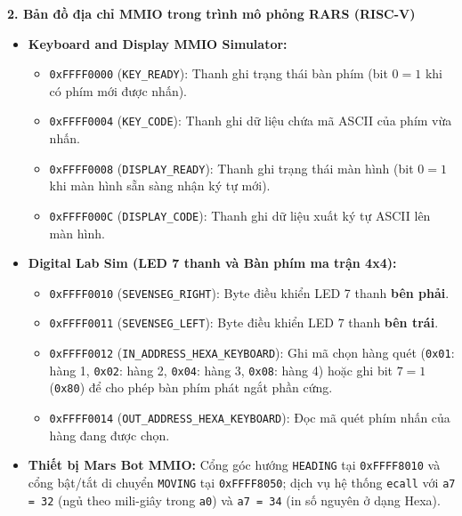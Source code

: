 \textbf{2. Bản đồ địa chỉ MMIO trong trình mô phỏng RARS (RISC-V)}
\begin{itemize}
    \item \textbf{Keyboard and Display MMIO Simulator:}
    \begin{itemize}
        \item \texttt{0xFFFF0000} (\texttt{KEY\_READY}): Thanh ghi trạng thái bàn phím (bit $0 = 1$ khi có phím mới được nhấn).
        \item \texttt{0xFFFF0004} (\texttt{KEY\_CODE}): Thanh ghi dữ liệu chứa mã ASCII của phím vừa nhấn.
        \item \texttt{0xFFFF0008} (\texttt{DISPLAY\_READY}): Thanh ghi trạng thái màn hình (bit $0 = 1$ khi màn hình sẵn sàng nhận ký tự mới).
        \item \texttt{0xFFFF000C} (\texttt{DISPLAY\_CODE}): Thanh ghi dữ liệu xuất ký tự ASCII lên màn hình.
    \end{itemize}
    \item \textbf{Digital Lab Sim (LED 7 thanh và Bàn phím ma trận 4x4):}
    \begin{itemize}
        \item \texttt{0xFFFF0010} (\texttt{SEVENSEG\_RIGHT}): Byte điều khiển LED 7 thanh \textbf{bên phải}.
        \item \texttt{0xFFFF0011} (\texttt{SEVENSEG\_LEFT}): Byte điều khiển LED 7 thanh \textbf{bên trái}.
        \item \texttt{0xFFFF0012} (\texttt{IN\_ADDRESS\_HEXA\_KEYBOARD}): Ghi mã chọn hàng quét (\texttt{0x01}: hàng 1, \texttt{0x02}: hàng 2, \texttt{0x04}: hàng 3, \texttt{0x08}: hàng 4) hoặc ghi bit $7 = 1$ (\texttt{0x80}) để cho phép bàn phím phát ngắt phần cứng.
        \item \texttt{0xFFFF0014} (\texttt{OUT\_ADDRESS\_HEXA\_KEYBOARD}): Đọc mã quét phím nhấn của hàng đang được chọn.
    \end{itemize}
    \item \textbf{Thiết bị Mars Bot MMIO:} Cổng góc hướng \texttt{HEADING} tại \texttt{0xFFFF8010} và cổng bật/tắt di chuyển \texttt{MOVING} tại \texttt{0xFFFF8050}; dịch vụ hệ thống \texttt{ecall} với \texttt{a7 = 32} (ngủ theo mili-giây trong \texttt{a0}) và \texttt{a7 = 34} (in số nguyên ở dạng Hexa).
\end{itemize}

